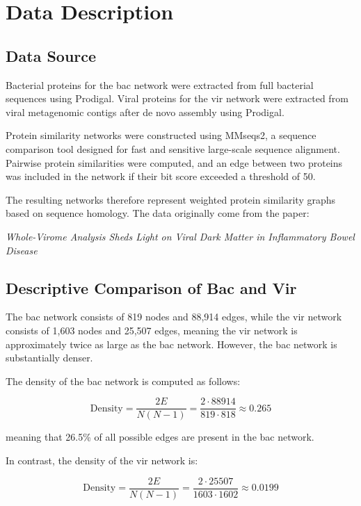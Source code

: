\section{Data Description}

\subsection{Data Source}

Bacterial proteins for the bac network 
were extracted from full bacterial sequences using Prodigal. 
Viral proteins for the vir network were extracted from viral metagenomic contigs 
after de novo assembly using Prodigal. 

Protein similarity networks were constructed using MMseqs2, a sequence comparison tool 
designed for fast and sensitive large-scale sequence alignment.
Pairwise protein similarities were computed, 
and an edge between two proteins was included in the network if their bit score 
exceeded a threshold of 50.

The resulting networks therefore represent weighted protein similarity 
graphs based on sequence homology. The data originally come from the paper:

\begin{center}
\textit{Whole-Virome Analysis Sheds Light on Viral Dark Matter in Inflammatory Bowel Disease}
\end{center}


\subsection{Descriptive Comparison of Bac and Vir}

The bac network consists of 819 nodes and 88,914 edges, while the vir network
consists of 1,603 nodes and 25,507 edges, meaning the vir network is approximately twice as large
as the bac network. However, the bac network is substantially denser.

The density of the bac network is computed as follows:

\[
\text{Density} = \frac{2E}{N(N-1)} = 
\frac{2 \cdot 88914}{819 \cdot 818} \approx 0.265
\]

meaning that 26.5\% of all possible edges are present in the bac network.

In contrast, the density of the vir network is:

\[
\text{Density} = \frac{2E}{N(N-1)} = 
\frac{2 \cdot 25507}{1603 \cdot 1602} \approx 0.0199
\]


